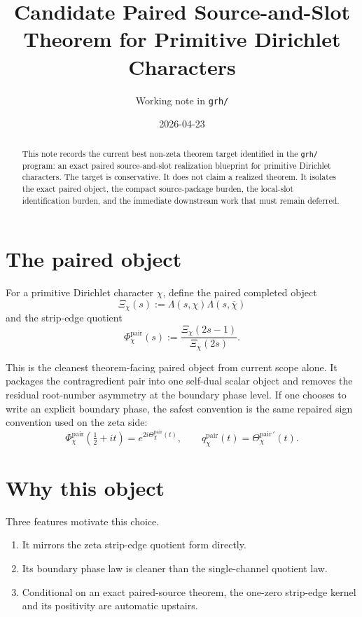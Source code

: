 \documentclass[11pt]{article}
\title{Candidate Paired Source-and-Slot Theorem for Primitive Dirichlet Characters}
\author{Working note in \texttt{grh/}}
\date{2026-04-23}
\begin{document}
\maketitle

\begin{abstract}
This note records the current best non-zeta theorem target identified in the
\texttt{grh/} program: an exact paired source-and-slot realization blueprint
for primitive Dirichlet characters. The target is conservative. It does not
claim a realized theorem. It isolates the exact paired object, the compact
source-package burden, the local-slot identification burden, and the immediate
downstream work that must remain deferred.
\end{abstract}

\section{The paired object}

For a primitive Dirichlet character \(\chi\), define the paired completed
object
\[
\Xi_\chi(s):=\Lambda(s,\chi)\Lambda(s,\overline\chi)
\]
and the strip-edge quotient
\[
\Phi_\chi^{\mathrm{pair}}(s):=\frac{\Xi_\chi(2s-1)}{\Xi_\chi(2s)}.
\]

This is the cleanest theorem-facing paired object from current scope alone. It
packages the contragredient pair into one self-dual scalar object and removes
the residual root-number asymmetry at the boundary phase level. If one chooses
to write an explicit boundary phase, the safest convention is the same repaired
sign convention used on the zeta side:
\[
\Phi_\chi^{\mathrm{pair}}\!\left(\tfrac12+it\right)=e^{2i\Theta_\chi^{\mathrm{pair}}(t)},
\qquad
q_\chi^{\mathrm{pair}}(t)=\Theta_\chi^{\mathrm{pair}\,\prime}(t).
\]

\section{Why this object}

Three features motivate this choice.

\begin{enumerate}
\item It mirrors the zeta strip-edge quotient form directly.
\item Its boundary phase law is cleaner than the single-channel quotient law.
\item Conditional on an exact paired-source theorem, the one-zero strip-edge
kernel and its positivity are automatic upstairs.
\end{enumerate}
\end{document}
